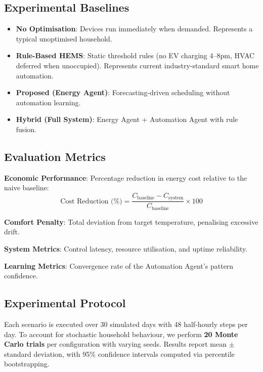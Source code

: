\documentclass[11pt,a4paper]{article}
\begin{document}
\subsection{Experimental Baselines}

\begin{itemize}
    \item \textbf{No Optimisation}: Devices run immediately when demanded. Represents a typical unoptimised household.
    \item \textbf{Rule-Based HEMS}: Static threshold rules (no EV charging 4--8pm, HVAC deferred when unoccupied). Represents current industry-standard smart home automation.
    \item \textbf{Proposed (Energy Agent)}: Forecasting-driven scheduling without automation learning.
    \item \textbf{Hybrid (Full System)}: Energy Agent + Automation Agent with rule fusion.
\end{itemize}

\subsection{Evaluation Metrics}

\textbf{Economic Performance}: Percentage reduction in energy cost relative to the naive baseline:
\begin{equation}
\text{Cost Reduction (\%)} = \frac{C_{\text{baseline}} - C_{\text{system}}}{C_{\text{baseline}}} \times 100
\end{equation}

\textbf{Comfort Penalty}: Total deviation from target temperature, penalising excessive drift.

\textbf{System Metrics}: Control latency, resource utilisation, and uptime reliability.

\textbf{Learning Metrics}: Convergence rate of the Automation Agent's pattern confidence.

\subsection{Experimental Protocol}

Each scenario is executed over 30 simulated days with 48 half-hourly steps per day. To account for stochastic household behaviour, we perform \textbf{20 Monte Carlo trials} per configuration with varying seeds. Results report mean $\pm$ standard deviation, with 95\% confidence intervals computed via percentile bootstrapping.
\end{document}

